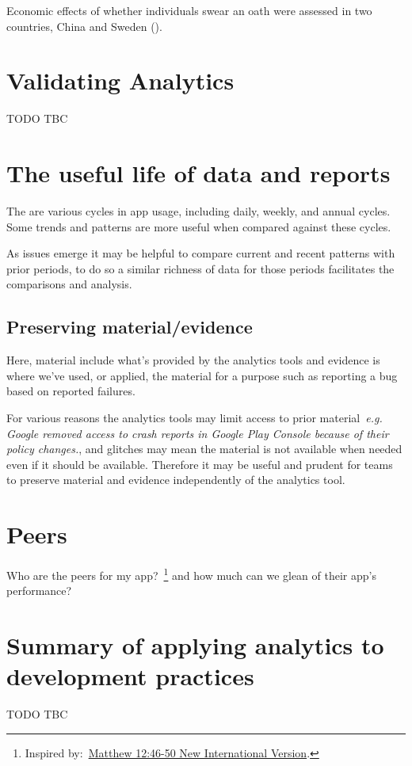 Economic effects of whether individuals swear an oath were assessed in two countries, China and Sweden (\cite{carlsson2013truth}). 


\section{Validating Analytics}

TODO TBC

\section{The useful life of data and reports}
The are various cycles in app usage, including daily, weekly, and annual cycles. Some trends and patterns are more useful when compared against these cycles. 

As issues emerge it may be helpful to compare current and recent patterns with prior periods, to do so a similar richness of data for those periods facilitates the comparisons and analysis.

\subsection{Preserving material/evidence}
Here, material include what's provided by the analytics tools and evidence is where we've used, or applied, the material for a purpose such as reporting a bug based on reported failures.

For various reasons the analytics tools may limit access to prior material~\emph{e.g. Google removed access to crash reports in Google Play Console because of their policy changes.}, and glitches may mean the material is not available when needed even if it should be available. Therefore it may be useful and prudent for teams to preserve material and evidence independently of the analytics tool. 

\section{Peers}
Who are the peers for my app?~\footnote{Inspired by:~\href{https://www.biblegateway.com/passage/?search=Matthew\%2012:46-50&version=NIV}{Matthew 12:46-50 New International Version}.} and how much can we glean of their app's performance?


\section{Summary of applying analytics to development practices}
TODO TBC
